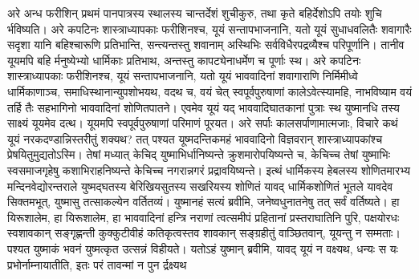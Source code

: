 \vakya अरे अन्ध फरीशिन् प्रथमं पानपात्रस्य स्थालस्य चान्तर्देशं शुचीकुरु, तथा कृते बहिर्देशोऽपि तयोः शुचि र्भविष्यति।
\vakya अरे कपटिनः शास्त्राध्यापकाः फरीशिनश्च, यूयं सन्तापभाजनानि, यतो यूयं सुधाधवलितैः शवागारैः सदृशा यानि बहिश्चारूणि प्रतिभान्ति, सन्त्यन्तस्तु शवानाम् अस्थिभिः सर्वविधैरपद्रव्यैश्च परिपूर्णानि।
\vakya तानीव यूयमपि बहि र्मनुष्येभ्यो धार्मिकाः प्रतिभाथ, अन्तस्तु कापट्येनाधर्मेण च पूर्णाः स्थ।
\vakya अरे कपटिनः शास्त्राध्यापकाः फरीशिनश्च, यूयं सन्तापभाजनानि, यतो यूयं भाववादिनां शवागाराणि निर्मिमीध्वे धार्मिकाणाञ्च, समाधिस्थानान्युपशोभयथ,
\vakya वदथ च, वयं चेत् स्वपूर्वपुरुषाणां कालेऽवेत्स्यामहि, नाभविष्याम वयं तर्हि तैः सहभागिनो भाववादिनां शोणितपातने।
\vakya एवमेव यूयं यद् भाववादिघातकानां पुत्राः स्थ युष्मानधि तस्य साक्ष्यं यूयमेव दत्थ।
\vakya यूयमपि स्वपूर्वपुरुषाणां परिमाणं पूरयत।
\vakya अरे सर्पाः कालसर्पाणामात्मजाः, विचारे कथं यूयं नरकदण्डान्निस्तरीतुं शक्यथ?
\vakya तत् पश्यत यूष्मदन्तिकमहं भाववादिनो विज्ञवरान् शास्त्राध्यापकांश्च प्रेषयितुमुद्यतोऽस्मि। तेषां मध्यात् केचिद् युष्माभिर्धानिष्यन्ते क्रुशमारोपयिष्यन्ते च, केचिच्च तेषां युष्माभिः स्वसमाजगृहेषु कशाभिराहनिष्यन्ते केचिच्च नगरान्नगरं प्रद्रावयिष्यन्ते।
\vakya इत्थं धार्मिकस्य हेबलस्य शोणितमारभ्य मन्दिनवेद्योरन्तराले युष्मद्घतस्य बेरिखियसुतस्य सखरियस्य शोणितं यावद् धार्मिकशोणितं भूतले यावदेव सिक्तमभूत्, युष्मासु तत्साकल्येन वर्तितव्यं।
\vakya युष्मानहं सत्यं ब्रवीमि, जनेष्वधुनातनेषु तत् सर्वं वर्तिष्यते।
\vakya हा यिरूशालेम, हा यिरूशालेम, हा भाववादिनां हन्त्रि नराणां त्वत्समीपं प्रहितानां प्रस्तराघातिनि पुरि, पक्षयोरधः स्वशावकान् सङ्गृह्णन्ती कुक्कुटीवीहं कतिकृत्वस्तव शावकान् सङ्ग्रहीतुं वाञ्छितवान्, यूयन्तु न सम्मताः।
\vakya पश्यत युष्माकं भवनं युष्मत्कृत उत्सन्नं विहीयते।
\vakya यतोऽहं युष्मान् ब्रवीमि, यावद् यूयं न वक्ष्यथ, धन्यः स यः प्रभोर्नाम्नायातीति, इतः परं तावन्मां न पुन र्द्रक्ष्यथ\eoc
